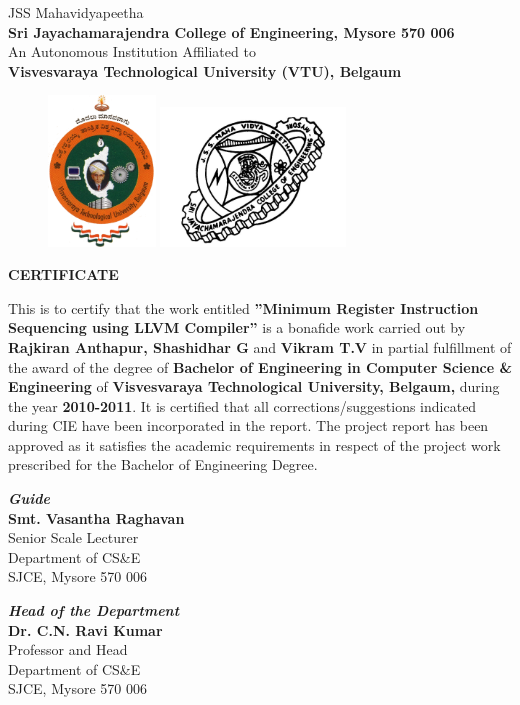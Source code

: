 \documentclass[12pt]{report}
\begin{document}
\begin{center}\large JSS Mahavidyapeetha\\\textbf{Sri Jayachamarajendra College of Engineering, Mysore 570 006}\\
An Autonomous Institution Affiliated to\\
\textbf{Visvesvaraya Technological University (VTU), Belgaum}\\
\vspace{0.2cm}
\begin{figure}[h]
\centering
\includegraphics[height=4cm]{vtu.png}
\hspace{0.1\textwidth}
\includegraphics[height=3.7cm]{jcelogo.jpg}
\end{figure}
\Huge{\bf {CERTIFICATE}}\end{center}

This is to certify that the work entitled {\bf ''Minimum Register Instruction Sequencing using LLVM Compiler''} is a bonafide work carried out by {\bf Rajkiran Anthapur, Shashidhar G} and {\bf Vikram T.V} in partial fulfillment of the award of the degree of {\bf Bachelor of Engineering in Computer Science \& Engineering} of {\bf Visvesvaraya Technological University, Belgaum,} during the year {\bf 2010-2011}. It is certified that all corrections/suggestions indicated during CIE have been incorporated in the report. The project report has been approved as it satisfies the academic requirements in respect of the project work prescribed for the Bachelor of Engineering Degree.

\vspace{3.5cm}
\begin{minipage}[t]{0.5\textwidth}%
{\bf \emph{Guide}\\}
{\bf Smt. Vasantha Raghavan} \\
Senior Scale Lecturer\\
Department of CS\&E\\
SJCE, Mysore 570 006
\end{minipage}\hspace{2cm}
\begin{minipage}[t]{0.4\textwidth}%
{\bf \emph{Head of the Department}}\\
{\bf Dr. C.N. Ravi Kumar}\\
Professor and Head\\
Department of CS\&E\\
SJCE, Mysore 570 006
\end{minipage}
\end{document}
